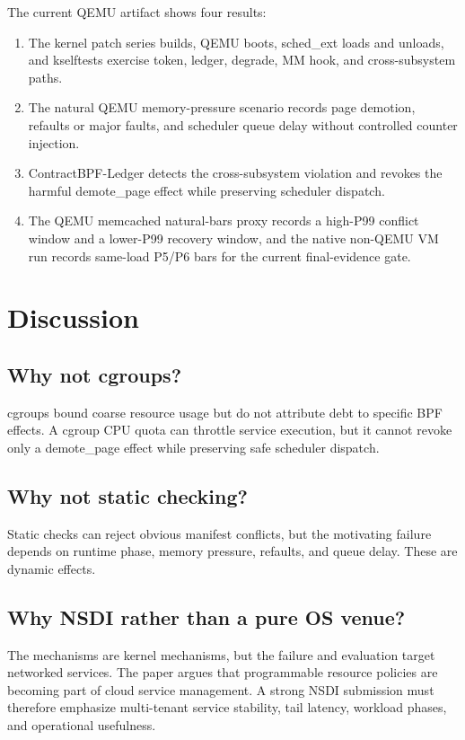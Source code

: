 \documentclass[letterpaper,twocolumn,10pt]{article}
\newcommand{\sys}{ContractBPF-Ledger\xspace}
\begin{document}
The current QEMU artifact shows four results:

\begin{enumerate}[leftmargin=*]
    \item The kernel patch series builds, QEMU boots, sched\_ext loads and unloads, and kselftests exercise token, ledger, degrade, MM hook, and cross-subsystem paths.
    \item The natural QEMU memory-pressure scenario records page demotion, refaults or major faults, and scheduler queue delay without controlled counter injection.
    \item \sys detects the cross-subsystem violation and revokes the harmful demote\_page effect while preserving scheduler dispatch.
    \item The QEMU memcached natural-bars proxy records a high-P99 conflict window and a lower-P99 recovery window, and the native non-QEMU VM run records same-load P5/P6 bars for the current final-evidence gate.
\end{enumerate}

\section{Discussion}

\subsection{Why not cgroups?}

cgroups bound coarse resource usage but do not attribute debt to specific BPF effects. A cgroup CPU quota can throttle service execution, but it cannot revoke only a demote\_page effect while preserving safe scheduler dispatch.

\subsection{Why not static checking?}

Static checks can reject obvious manifest conflicts, but the motivating failure depends on runtime phase, memory pressure, refaults, and queue delay. These are dynamic effects.

\subsection{Why NSDI rather than a pure OS venue?}

The mechanisms are kernel mechanisms, but the failure and evaluation target networked services. The paper argues that programmable resource policies are becoming part of cloud service management. A strong NSDI submission must therefore emphasize multi-tenant service stability, tail latency, workload phases, and operational usefulness.
\end{document}

